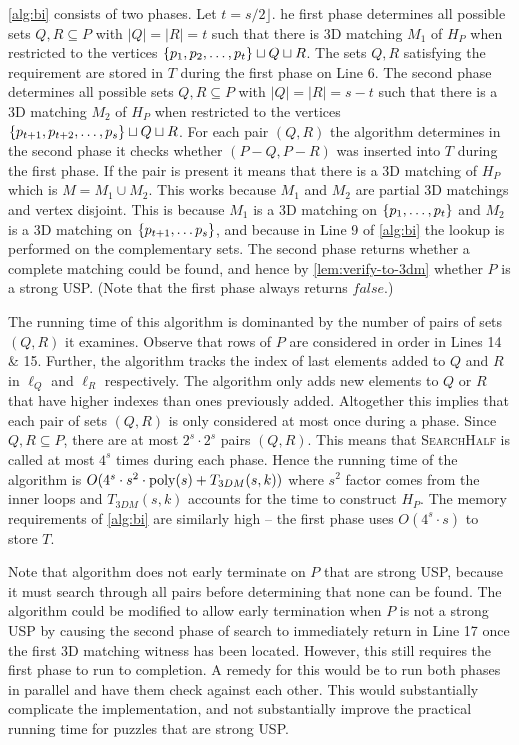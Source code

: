 \documentclass[11pt]{article}
\newcommand\sse{\subseteq}
\begin{document}
\autoref{alg:bi} consists of two phases. Let $t = s/2 \rfloor$. he
first phase determines all possible sets $Q,R \sse P$ with $|Q| = |R|
= t$ such that there is 3D matching $M_1$ of $H_P$ when restricted to
the vertices $\left\{ p_1,p_2, \ldots, p_t \right\} \sqcup Q \sqcup R$.  The sets
$Q,R$ satisfying the requirement are stored in $T$ during the first
phase on Line 6.  The second phase determines all possible sets $Q,R
\sse P$ with $|Q| = |R| = s - t$ such that there is a 3D matching
$M_2$ of $H_P$ when restricted to the vertices
$\left\{ p_{t+1},p_{t+2},\ldots,p_s \right\} \sqcup Q \sqcup R$.  For each pair
$(Q,R)$ the algorithm determines in the second phase it checks whether
$(P - Q, P - R)$ was inserted into $T$ during the first phase.  If the
pair is present it means that there is a 3D matching of $H_P$ which is
$M = M_1 \cup M_2$.  This works because $M_1$ and $M_2$ are partial 3D
matchings and vertex disjoint.  This is because $M_1$ is a 3D matching
on $\left\{ p_1,\ldots,p_t \right\}$ and $M_2$ is a 3D matching on
$\left\{ p_{t+1},\ldots p_s \right\}$, and because in Line 9 of \autoref{alg:bi}
the lookup is performed on the complementary sets.  The second phase
returns whether a complete matching could be found, and hence by
\autoref{lem:verify-to-3dm} whether $P$ is a strong USP.  (Note that
the first phase always returns $false$.)

The running time of this algorithm is dominanted by the number of
pairs of sets $(Q,R)$ it examines.  Observe that rows of $P$ are
considered in order in Lines 14 \& 15.  Further, the algorithm tracks
the index of last elements added to $Q$ and $R$ in $\ell_Q$ and
$\ell_R$ respectively.  The algorithm only adds new elements to $Q$ or
$R$ that have higher indexes than ones previously added.  Altogether
this implies that each pair of sets $(Q,R)$ is only considered at most
once during a phase.  Since $Q, R \sse P$, there are at most $2^s
\cdot 2^s$ pairs $(Q,R)$.  This means that \textsc{SearchHalf} is
called at most $4^s$ times during each phase.  Hence the running time
of the algorithm is $O(4^s \cdot s^2 \cdot \operatorname{poly}(s) + T_{3DM}(s,k))$
where $s^2$ factor comes from the inner loops and $T_{3DM}(s,k)$
accounts for the time to construct $H_P$.  The memory requirements of
\autoref{alg:bi} are similarly high -- the first phase uses $O(4^s
\cdot s)$ to store $T$.  

Note that algorithm does not early terminate on $P$ that are strong
USP, because it must search through all pairs before determining that
none can be found.  The algorithm could be modified to allow early
termination when $P$ is not a strong USP by causing the second phase
of search to immediately return in Line 17 once the first 3D matching
witness has been located.  However, this still requires the first
phase to run to completion.  A remedy for this would be to run both
phases in parallel and have them check against each other.  This would
substantially complicate the implementation, and not substantially
improve the practical running time for puzzles that are strong USP.
\end{document}
